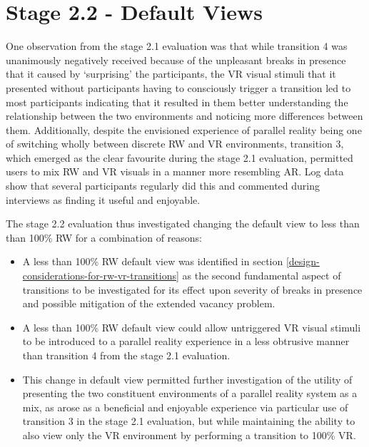 


\section{Stage 2.2 - Default Views}

One observation from the stage 2.1 evaluation was that while transition 4 was unanimously negatively received because of the unpleasant breaks in presence that it caused by `surprising' the participants, the VR visual stimuli that it presented without participants having to consciously trigger a transition led to most participants indicating that it resulted in them better understanding the relationship between the two environments and noticing more differences between them. Additionally, despite the envisioned experience of parallel reality being one of switching wholly between discrete RW and VR environments, transition 3, which emerged as the clear favourite during the stage 2.1 evaluation, permitted users to mix RW and VR visuals in a manner more resembling AR. Log data show that several participants regularly did this and commented during interviews as finding it useful and enjoyable.

The stage 2.2 evaluation thus investigated changing the default view to less than than 100\% RW for a combination of reasons:

\begin{itemize}
	\item A less than 100\% RW default view was identified in section \ref{design-considerations-for-rw-vr-transitions} as the second fundamental aspect of transitions to be investigated for its effect upon severity of breaks in presence and possible mitigation of the extended vacancy problem.
	\item A less than 100\% RW default view could allow untriggered VR visual stimuli to be introduced to a parallel reality experience in a less obtrusive manner than transition 4 from the stage 2.1 evaluation.
	\item This change in default view permitted further investigation of the utility of presenting the two constituent environments of a parallel reality system as a mix, as arose as a beneficial and enjoyable experience via particular use of transition 3 in the stage 2.1 evaluation, but while maintaining the ability to also view only the VR environment by performing a transition to 100\% VR.
\end{itemize}

